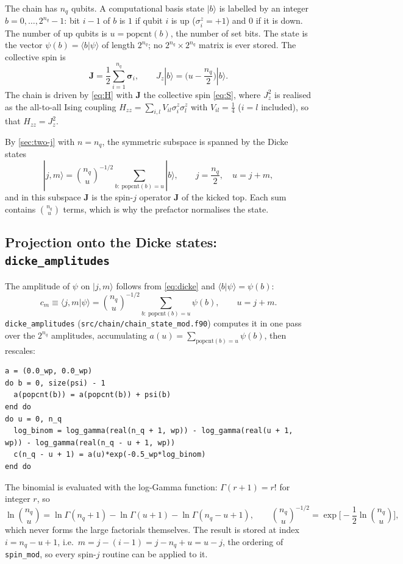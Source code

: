 \documentclass[11pt,a4paper]{article}
\newcommand{\vJ}{\bm{J}}
\begin{document}
The chain has $n_q$ qubits. A computational basis state $|b\rangle$ is labelled by an integer $b = 0,\dots,2^{n_q}-1$:
bit $i-1$ of $b$ is $1$ if qubit $i$ is up ($\sigma^z_i = +1$) and $0$ if it is down. The number of up qubits is
$u = \mathrm{popcnt}(b)$, the number of set bits. The state is the vector $\psi(b) = \langle b|\psi\rangle$ of length
$2^{n_q}$; no $2^{n_q}\times2^{n_q}$ matrix is ever stored. The collective spin is
\begin{equation}\label{eq:S}
  \vJ = \frac12\sum_{i=1}^{n_q}\bm\sigma_i ,\qquad J_z|b\rangle = \Big(u - \frac{n_q}{2}\Big)|b\rangle .
\end{equation}
The chain is driven by \eqref{eq:H} with $\vJ$ the collective spin \eqref{eq:S}, where $J_z^2$ is realised as the all-to-all Ising coupling
$H_{zz} = \sum_{i,l}V_{il}\sigma^z_i\sigma^z_l$ with $V_{il} = \frac14$ ($i = l$ included), so that $H_{zz} = J_z^2$.

By \cref{sec:two-j} with $n = n_q$, the symmetric subspace is spanned by the Dicke states
\begin{equation}\label{eq:dicke}
  |j,m\rangle = \binom{n_q}{u}^{-1/2}\sum_{b:\ \mathrm{popcnt}(b)=u}|b\rangle ,\qquad j = \frac{n_q}{2},\quad u = j+m ,
\end{equation}
and in this subspace $\vJ$ is the spin-$j$ operator $\vJ$ of the kicked top. Each sum contains $\binom{n_q}{u}$ terms,
which is why the prefactor normalises the state.

\subsection{Projection onto the Dicke states: \texttt{dicke\_amplitudes}}

The amplitude of $\psi$ on $|j,m\rangle$ follows from \eqref{eq:dicke} and $\langle b|\psi\rangle = \psi(b)$:
\begin{equation}\label{eq:dicke-proj}
  \boxed{c_m \equiv \langle j,m|\psi\rangle = \binom{n_q}{u}^{-1/2}\sum_{b:\ \mathrm{popcnt}(b)=u}\psi(b),\qquad u = j+m .}
\end{equation}
\texttt{dicke\_amplitudes} (\texttt{src/chain/chain\_state\_mod.f90}) computes it in one pass over the $2^{n_q}$
amplitudes, accumulating $a(u) = \sum_{\mathrm{popcnt}(b)=u}\psi(b)$, then rescales:
\begin{lstlisting}
a = (0.0_wp, 0.0_wp)
do b = 0, size(psi) - 1
  a(popcnt(b)) = a(popcnt(b)) + psi(b)
end do
do u = 0, n_q
  log_binom = log_gamma(real(n_q + 1, wp)) - log_gamma(real(u + 1, wp)) - log_gamma(real(n_q - u + 1, wp))
  c(n_q - u + 1) = a(u)*exp(-0.5_wp*log_binom)
end do
\end{lstlisting}
The binomial is evaluated with the log-Gamma function: $\Gamma(r+1) = r!$ for integer $r$, so
\begin{equation}\label{eq:loggamma}
  \ln\binom{n_q}{u} = \ln\Gamma(n_q+1) - \ln\Gamma(u+1) - \ln\Gamma(n_q-u+1),\qquad
  \binom{n_q}{u}^{-1/2} = \exp\Big[-\frac12\ln\binom{n_q}{u}\Big],
\end{equation}
which never forms the large factorials themselves. The result is stored at index $i = n_q-u+1$, i.e.\ $m = j-(i-1) =
j - n_q + u = u-j$, the ordering of \texttt{spin\_mod}, so every spin-$j$ routine can be applied to it.
\end{document}

